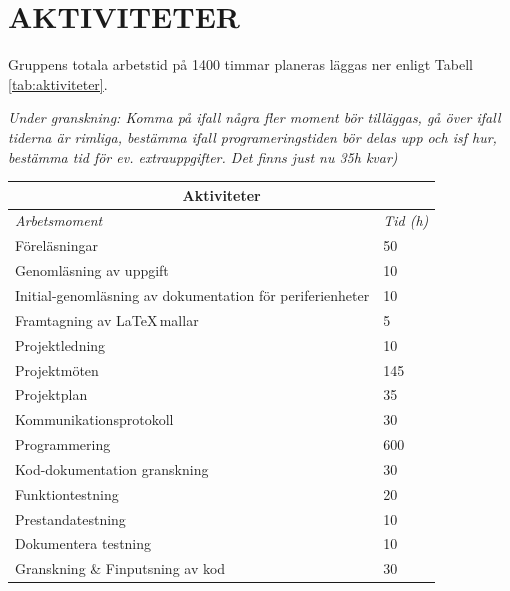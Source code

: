\documentclass[a4paper]{article}
\begin{document}
\section{AKTIVITETER}
\label{sec:sktiviteter}
Gruppens totala arbetstid på 1400 timmar planeras läggas ner enligt Tabell \ref{tab:aktiviteter}.
\newline

\textit{Under granskning: Komma på ifall några fler moment bör tilläggas, gå över ifall tiderna är rimliga, bestämma ifall programeringstiden bör delas upp och isf hur, bestämma tid för ev. extrauppgifter. Det finns just nu 35h kvar)}
\begin{table}[b]
\begin{tabular}{|l|l|}
\hline
\multicolumn{2}{|c|}{\textbf{Aktiviteter}}                                   \\ \hline
\textit{Arbetsmoment}                                     & \textit{Tid (h)} \\ \hline
Föreläsningar                                             & 50               \\
Genomläsning av uppgift                                   & 10               \\
Initial-genomläsning av dokumentation för periferienheter & 10               \\
Framtagning av \LaTeX \,mallar                            & 5                \\
Projektledning                                            & 10               \\
Projektmöten                                              & 145              \\
Projektplan                                               & 35               \\
Kommunikationsprotokoll                                   & 30               \\
Programmering                                             & 600              \\
Kod-dokumentation granskning                              & 30               \\
Funktiontestning                                          & 20               \\
Prestandatestning                                         & 10               \\
Dokumentera testning                                      & 10               \\
Granskning \& Finputsning av kod                          & 30               \\

\end{tabular}
\end{table}
\end{document}

